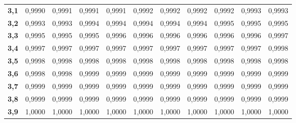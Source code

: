 \documentclass[11pt,a4paper]{article}
\begin{document}
\begin{center}
\begin{tabular}{c|cccccccccc}
\textbf{3,1} & 0,9990 & 0,9991 & 0,9991 & 0,9991 & 0,9992 & 0,9992 & 0,9992 & 0,9992 & 0,9993 & 0,9993\\
\textbf{3,2} & 0,9993 & 0,9993 & 0,9994 & 0,9994 & 0,9994 & 0,9994 & 0,9994 & 0,9995 & 0,9995 & 0,9995\\
\textbf{3,3} & 0,9995 & 0,9995 & 0,9995 & 0,9996 & 0,9996 & 0,9996 & 0,9996 & 0,9996 & 0,9996 & 0,9997\\
\textbf{3,4} & 0,9997 & 0,9997 & 0,9997 & 0,9997 & 0,9997 & 0,9997 & 0,9997 & 0,9997 & 0,9997 & 0,9998\\[2pt]
\textbf{3,5} & 0,9998 & 0,9998 & 0,9998 & 0,9998 & 0,9998 & 0,9998 & 0,9998 & 0,9998 & 0,9998 & 0,9998\\
\textbf{3,6} & 0,9998 & 0,9998 & 0,9999 & 0,9999 & 0,9999 & 0,9999 & 0,9999 & 0,9999 & 0,9999 & 0,9999\\
\textbf{3,7} & 0,9999 & 0,9999 & 0,9999 & 0,9999 & 0,9999 & 0,9999 & 0,9999 & 0,9999 & 0,9999 & 0,9999\\
\textbf{3,8} & 0,9999 & 0,9999 & 0,9999 & 0,9999 & 0,9999 & 0,9999 & 0,9999 & 0,9999 & 0,9999 & 0,9999\\
\textbf{3,9} & 1,0000 & 1,0000 & 1,0000 & 1,0000 & 1,0000 & 1,0000 & 1,0000 & 1,0000 & 1,0000 & 1,0000\\
\bottomrule\end{tabular}
\end{center}
\end{document}
